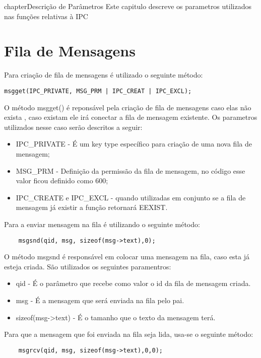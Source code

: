 chapter{Descrição de Parâmetros}
Este capitulo descreve os parametros utilizados nas funções relativas à IPC
\section{Fila de Mensagens}
Para criação de fila de mensagens é utilizado o seguinte método:
\begin{lstlisting}
msgget(IPC_PRIVATE, MSG_PRM | IPC_CREAT | IPC_EXCL);
\end{lstlisting}

O método msgget() é reponsável pela criação de fila de mensagens caso elas não exista , caso existam ele irá conectar a fila de mensagem existente. Os parametros utilizados nesse caso serão descritos a seguir:

\begin{itemize}
	\item IPC\_PRIVATE - É um key type específico para criação de uma nova fila de mensagem;
    \item MSG\_PRM - Definição da permissão da fila de mensagem, no código esse valor ficou definido como 600;
	\item IPC\_CREATE e IPC\_EXCL - quando utilizadas em conjunto se a fila de mensagem já existir a função retornará EEXIST.  
\end{itemize}

Para a enviar mensagem na fila é utilizando o seguinte método:
\begin{lstlisting}
	msgsnd(qid, msg, sizeof(msg->text),0);
\end{lstlisting}

O método msgsnd é responsável em colocar uma mensagem na fila, caso esta já esteja criada. São utilizados os seguintes paramentros:

\begin{itemize}
	\item qid - É o parâmetro que recebe como valor o id da fila de mensagem criada.
	\item msg - É a mensagem que será enviada na fila pelo pai.
	\item sizeof(msg->text) - É o tamanho que o texto da mensagem terá.
\end{itemize}

Para que a mensagem que foi enviada na fila seja lida, usa-se o seguinte método:
\begin{lstlisting}
	msgrcv(qid, msg, sizeof(msg->text),0,0);
\end{lstlisting}

